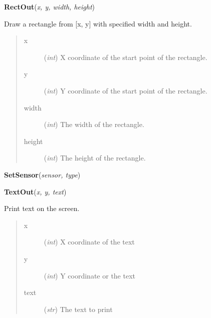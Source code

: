 \documentclass[10pt,a4paper]{article}
\begin{document}
 

\vspace{6pt}
{\bf RectOut}({\it x, y, width, height}) 
    
    Draw a rectangle from [x, y] with specified width and height.








\begin{quote}
    \begin{description}
        
\item[x] ({\emph{int}}) X coordinate of the start point of the rectangle.

\item[y] ({\emph{int}}) Y coordinate of the start point of the rectangle.

\item[width] ({\emph{int}}) The width of the rectangle.

\item[height] ({\emph{int}}) The height of the rectangle.

    \end{description}
\end{quote}

 

\vspace{6pt}
{\bf SetSensor}({\it sensor, type}) 

 

\vspace{6pt}
{\bf TextOut}({\it x, y, text}) 
    
    Print text on the screen.
    






\begin{quote}
    \begin{description}
        
\item[x] ({\emph{int}}) X coordinate of the text

\item[y] ({\emph{int}}) Y coordinate or the text

\item[text] ({\emph{str}}) The text to print

    \end{description}
\end{quote}

 
\end{document}
